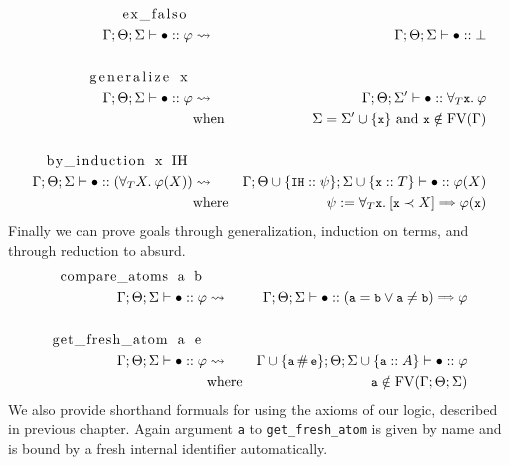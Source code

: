 \documentclass[english, mgr]{iithesis}
\renewcommand{\tt}[1]{\texttt{\small{#1}}}
\begin{document}
\begin{eqnarray*}
  \text{\lstinline[columns=fixed]{ex_falso} } & & \\
  \jgmnt[\Gamma; \Theta; \Sigma]{\hole\ofkind{{\formphi}}} & \leadsto & \jgmnt[\Gamma; \Theta; \Sigma]{\hole\ofkind\bot} \\
  & & \\
  \text{\lstinline[columns=fixed]{generalize x} }& & \\
  \jgmnt[\Gamma; \Theta; \Sigma]{\hole\ofkind{{\formphi}}} & \leadsto & \jgmnt[\Gamma; \Theta; \Sigma']{\hole\ofkind{\kForallTerm{\tt{x}}{\formphi}}} \\
  & \text{when} & \Sigma = \Sigma' \cup \{\tt{x}\} \text{ and } \tt{x} \notin \fv[\Gamma] \\
  & & \\
  \text{\lstinline[columns=fixed]{by_induction x IH} } & & \\
  \jgmnt[\Gamma; \Theta; \Sigma]{\hole\ofkind{(\fForallTerm{\termv}\formphi(\termv))}} & \leadsto & \jgmnt[\Gamma; \Theta \cup \{\tt{IH} \ofkind \psi \};\Sigma\cup \{\tt{x} \ofkind {T}\}]{\hole\ofkind{\formphi(\termv)}} \\
   & \text{where} & {\psi := \fForallTerm{\tt{x}}\fCImp{\tt{x} \cshlt \termv}{\formphi(\tt{x})}}
  \end{eqnarray*}
Finally we can prove goals through generalization, induction on terms, and through reduction to absurd.
\begin{eqnarray*}
  \text{\lstinline[columns=fixed]{compare_atoms a b} }& & \\
  \jgmnt[\Gamma; \Theta; \Sigma]{\hole\ofkind{{\formphi}}} & \leadsto & \jgmnt[\Gamma; \Theta; \Sigma]{\hole\ofkind{(\tt{a} \ceq \tt{b} \vee \tt{a}\cneq \tt{b})\fImp{\formphi}}} \\
  & & \\
  \text{\lstinline[columns=fixed]{get_fresh_atom a e} }& & \\
  \jgmnt[\Gamma; \Theta; \Sigma]{\hole\ofkind{{\formphi}}} & \leadsto & \jgmnt[\Gamma \cup {\{\tt{a} \cfresh \tt{e}\}}; \Theta; \Sigma\cup {\{\tt{a} \ofkind {A}\}}]{\hole\ofkind{\formphi}} \\
   & \text{where} & \tt{a} \notin \fv[\Gamma; \Theta; \Sigma] \\
\end{eqnarray*}
We also provide shorthand formuals for using the axioms of our logic, described
in previous chapter.
Again argument \tt{a} to \tt{get\_fresh\_atom} is given by name and is bound by
a fresh internal identifier automatically.
\end{document}

